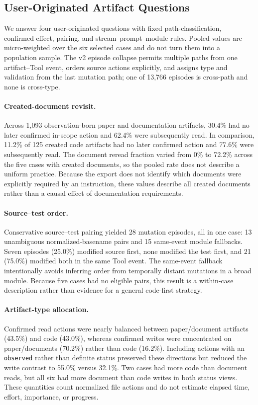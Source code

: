 \documentclass[letterpaper]{article}
\begin{document}
\subsection{User-Originated Artifact Questions}

We answer four user-originated questions with fixed path-classification,
confirmed-effect, pairing, and stream--prompt--module rules.  Pooled values are
micro-weighted over the six selected cases and do not turn them into a
population sample.  The v2 episode collapse permits multiple paths from one
artifact--Tool event, orders source actions explicitly, and assigns type and
validation from the last mutation path; one of 13,766 episodes is cross-path
and none is cross-type.

\paragraph{Created-document revisit.}
Across 1,093 observation-born paper and documentation artifacts, 30.4\% had no
later confirmed in-scope action and 62.4\% were subsequently read.  In
comparison, 11.2\% of 125 created code artifacts had no later confirmed action
and 77.6\% were subsequently read.  The document reread fraction varied from
0\% to 72.2\% across the five cases with created documents, so the pooled rate
does not describe a uniform practice.  Because the export does not identify
which documents were explicitly required by an instruction, these values
describe all created documents rather than a causal effect of documentation
requirements.

\paragraph{Source--test order.}
Conservative source--test pairing yielded 28 mutation episodes, all in one
case: 13 unambiguous normalized-basename pairs and 15 same-event module
fallbacks.  Seven episodes (25.0\%) modified source first, none modified the
test first, and 21 (75.0\%) modified both in the same Tool event.  The
same-event fallback intentionally avoids inferring order from temporally
distant mutations in a broad module.  Because five cases had no eligible
pairs, this result is a within-case description rather than evidence for a
general code-first strategy.

\paragraph{Artifact-type allocation.}
Confirmed read actions were nearly balanced between paper/document artifacts
(43.5\%) and code (43.0\%), whereas confirmed writes were concentrated on
paper/documents (70.2\%) rather than code (16.2\%).  Including actions with an
\texttt{observed} rather than definite status preserved these directions but
reduced the write contrast to 55.0\% versus 32.1\%.  Two cases had more code
than document reads, but all six had more document than code writes in both
status views.  These quantities count normalized file actions and do not
estimate elapsed time, effort, importance, or progress.
\end{document}
